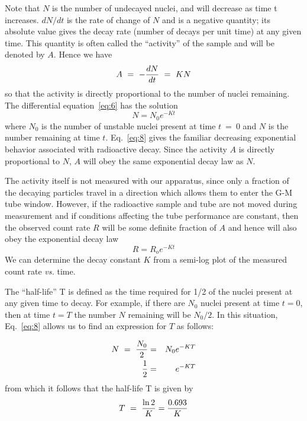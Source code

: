 Note that $N$ is the number of undecayed nuclei, and will decrease as time t
increases.  $dN/dt$ is the rate of change of $N$ and is a negative quantity; its
absolute value gives the decay rate (number of decays per unit time) at any
given time.  This quantity is often called the ``activity'' of the sample and
will be denoted by $A$.  Hence we have
\begin{equation}
A ~=~ - { dN \over dt } ~=~ KN
\label{eq:7}
\end{equation}
so that the activity is directly proportional to the number of nuclei
remaining.  The differential equation~\ref{eq:6} has the solution
\begin{equation}
N = N_{0} e^{-Kt}
\label{eq:8}
\end{equation}
where $N_0$ is the number of unstable nuclei present at time $t~=~0$ and $N$ is
the number remaining at time $t$.  Eq.~\ref{eq:8} gives the familiar decreasing
exponential behavior associated with radioactive decay.  Since the
activity $A$ is directly proportional to $N$, $A$ will obey the same
exponential decay law as $N$.

The activity itself is not measured with our apparatus, since only a
fraction of the decaying particles travel in a direction which allows
them to enter the G-M tube window.  However, if the radioactive sample
and tube are not moved during measurement and if conditions affecting
the tube performance are constant, then the observed count rate $R$ will be some
definite fraction of $A$ and hence will also obey the exponential decay
law
\begin{equation}
R = R_{o} e^{-Kt}
\label{eq:9}
\end{equation}
We can determine the decay constant $K$ from a semi-log plot of the
measured count rate {\em vs.} time.

The ``half-life'' T is defined as the time
required for 1/2 of the nuclei present at any given time to decay.
For example, if there are $N_0$ nuclei present at time $t = 0$, then at
time $t = T$ the number $N$ remaining will be $N_0/2$.  In this situation,
Eq.~\ref{eq:8} allows us to find an expression for $T$ as follows:  

\begin{eqnarray}
N ~=~ {N_0 \over 2} &=& N_0 e^{-KT}\\
 {1 \over 2} &=& e^{-KT}
\end{eqnarray}
from which it follows that the half-life T is given by
\begin{equation}
T ~=~ {\ln{2} \over K} = {0.693 \over K}
\label{eq:11}
\end{equation}

